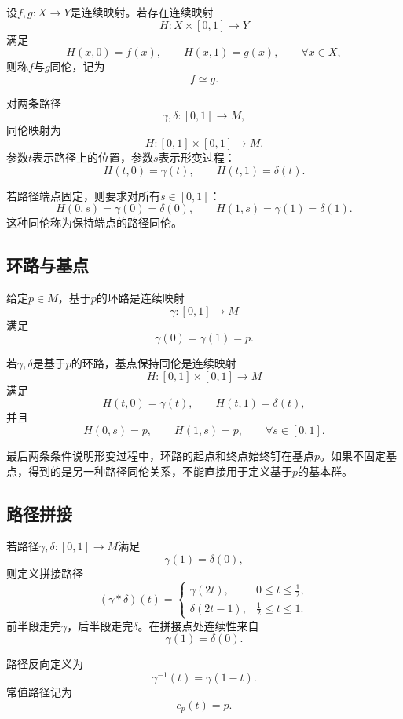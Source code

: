 \begin{definition}[同伦]
设$f,g:X\to Y$是连续映射。若存在连续映射
\[
    H:X\times[0,1]\to Y
\]
满足
\[
    H(x,0)=f(x),
    \qquad
    H(x,1)=g(x),
    \qquad
    \forall x\in X,
\]
则称$f$与$g$同伦，记为
\[
    f\simeq g.
\]
\end{definition}

对两条路径
\[
    \gamma,\delta:[0,1]\to M,
\]
同伦映射为
\[
    H:[0,1]\times[0,1]\to M.
\]
参数$t$表示路径上的位置，参数$s$表示形变过程：
\[
    H(t,0)=\gamma(t),
    \qquad
    H(t,1)=\delta(t).
\]

若路径端点固定，则要求对所有$s\in[0,1]$：
\[
    H(0,s)=\gamma(0)=\delta(0),
    \qquad
    H(1,s)=\gamma(1)=\delta(1).
\]
这种同伦称为保持端点的路径同伦。

\subsection{环路与基点}

\begin{definition}[基于$p$的环路]
给定$p\in M$，基于$p$的环路是连续映射
\[
    \gamma:[0,1]\to M
\]
满足
\[
    \gamma(0)=\gamma(1)=p.
\]
\end{definition}

若$\gamma,\delta$是基于$p$的环路，基点保持同伦是连续映射
\[
    H:[0,1]\times[0,1]\to M
\]
满足
\[
    H(t,0)=\gamma(t),
    \qquad
    H(t,1)=\delta(t),
\]
并且
\[
    H(0,s)=p,
    \qquad
    H(1,s)=p,
    \qquad
    \forall s\in[0,1].
\]

最后两条条件说明形变过程中，环路的起点和终点始终钉在基点$p$。如果不固定基点，得到的是另一种路径同伦关系，不能直接用于定义基于$p$的基本群。

\subsection{路径拼接}

若路径$\gamma,\delta:[0,1]\to M$满足
\[
    \gamma(1)=\delta(0),
\]
则定义拼接路径
\[
    (\gamma*\delta)(t)
    =
    \begin{cases}
        \gamma(2t),&0\le t\le\frac12,\\[4pt]
        \delta(2t-1),&\frac12\le t\le1.
    \end{cases}
\]
前半段走完$\gamma$，后半段走完$\delta$。在拼接点处连续性来自
\[
    \gamma(1)=\delta(0).
\]

路径反向定义为
\[
    \gamma^{-1}(t)=\gamma(1-t).
\]
常值路径记为
\[
    c_p(t)=p.
\]


